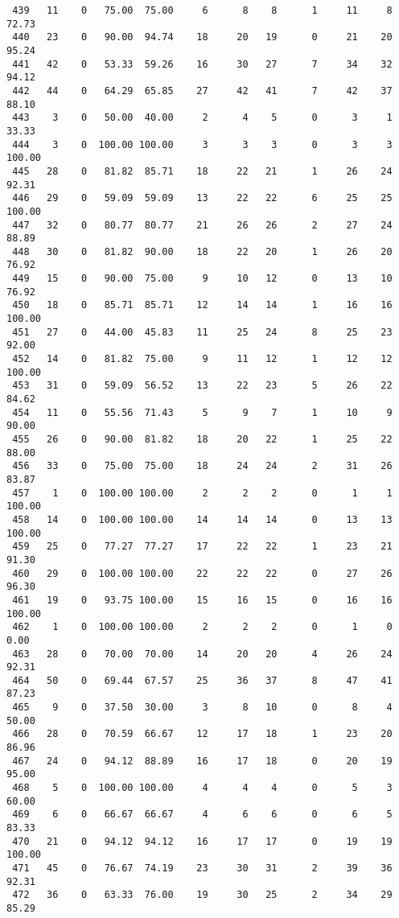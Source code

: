 \begin{verbatim}
 439   11    0   75.00  75.00     6      8    8      1     11     8    72.73
 440   23    0   90.00  94.74    18     20   19      0     21    20    95.24
 441   42    0   53.33  59.26    16     30   27      7     34    32    94.12
 442   44    0   64.29  65.85    27     42   41      7     42    37    88.10
 443    3    0   50.00  40.00     2      4    5      0      3     1    33.33
 444    3    0  100.00 100.00     3      3    3      0      3     3   100.00
 445   28    0   81.82  85.71    18     22   21      1     26    24    92.31
 446   29    0   59.09  59.09    13     22   22      6     25    25   100.00
 447   32    0   80.77  80.77    21     26   26      2     27    24    88.89
 448   30    0   81.82  90.00    18     22   20      1     26    20    76.92
 449   15    0   90.00  75.00     9     10   12      0     13    10    76.92
 450   18    0   85.71  85.71    12     14   14      1     16    16   100.00
 451   27    0   44.00  45.83    11     25   24      8     25    23    92.00
 452   14    0   81.82  75.00     9     11   12      1     12    12   100.00
 453   31    0   59.09  56.52    13     22   23      5     26    22    84.62
 454   11    0   55.56  71.43     5      9    7      1     10     9    90.00
 455   26    0   90.00  81.82    18     20   22      1     25    22    88.00
 456   33    0   75.00  75.00    18     24   24      2     31    26    83.87
 457    1    0  100.00 100.00     2      2    2      0      1     1   100.00
 458   14    0  100.00 100.00    14     14   14      0     13    13   100.00
 459   25    0   77.27  77.27    17     22   22      1     23    21    91.30
 460   29    0  100.00 100.00    22     22   22      0     27    26    96.30
 461   19    0   93.75 100.00    15     16   15      0     16    16   100.00
 462    1    0  100.00 100.00     2      2    2      0      1     0     0.00
 463   28    0   70.00  70.00    14     20   20      4     26    24    92.31
 464   50    0   69.44  67.57    25     36   37      8     47    41    87.23
 465    9    0   37.50  30.00     3      8   10      0      8     4    50.00
 466   28    0   70.59  66.67    12     17   18      1     23    20    86.96
 467   24    0   94.12  88.89    16     17   18      0     20    19    95.00
 468    5    0  100.00 100.00     4      4    4      0      5     3    60.00
 469    6    0   66.67  66.67     4      6    6      0      6     5    83.33
 470   21    0   94.12  94.12    16     17   17      0     19    19   100.00
 471   45    0   76.67  74.19    23     30   31      2     39    36    92.31
 472   36    0   63.33  76.00    19     30   25      2     34    29    85.29

\end{verbatim}
